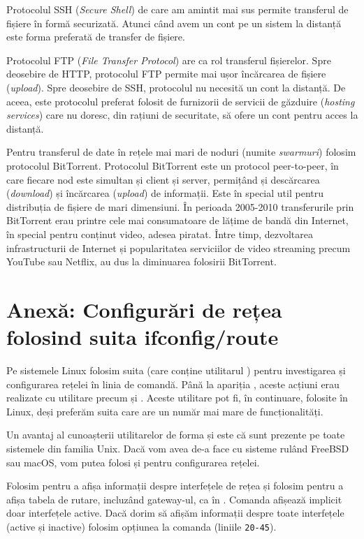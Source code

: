 Protocolul SSH (\textit{Secure Shell}) de care am amintit mai sus permite transferul de fișiere în formă securizată.
Atunci când avem un cont pe un sistem la distanță este forma preferată de transfer de fișiere.

Protocolul FTP  (\textit{File Transfer Protocol}) are ca rol transferul fișierelor.
Spre deosebire de HTTP, protocolul FTP permite mai ușor încărcarea de fișiere (\textit{upload}).
Spre deosebire de SSH, protocolul nu necesită un cont la distanță.
De aceea, este protocolul preferat folosit de furnizorii de servicii de găzduire (\textit{hosting services}) care nu doresc, din rațiuni de securitate, să ofere un cont pentru acces la distanță.

Pentru transferul de date în rețele mai mari de noduri (numite \textit{swarmuri}) folosim protocolul BitTorrent.
Protocolul BitTorrent este un protocol peer-to-peer, în care fiecare nod este simultan și client și server, permițând și descărcarea (\textit{download}) și încărcarea (\textit{upload}) de informații.
Este în special util pentru distribuția de fișiere de mari dimensiuni.
În perioada 2005-2010 transferurile prin BitTorrent erau printre cele mai consumatoare de lățime de bandă din Internet, în special pentru conținut video, adesea piratat.
Între timp, dezvoltarea infrastructurii de Internet și popularitatea serviciilor de video streaming precum YouTube sau Netflix, au dus la diminuarea folosirii BitTorrent.

\section{Anexă: Configurări de rețea folosind suita ifconfig/route}
\label{sec:net:config-ifconfig}

Pe sistemele Linux folosim suita  (care conține utilitarul ) pentru investigarea și configurarea rețelei în linia de comandă.
Până la apariția , aceste acțiuni erau realizate cu utilitare precum  și .
Aceste utilitare pot fi, în continuare, folosite în Linux, deși preferăm suita  care are un număr mai mare de funcționalități.

Un avantaj al cunoașterii utilitarelor de forma  și  este că sunt prezente pe toate sistemele din familia Unix.
Dacă vom avea de-a face cu sisteme rulând FreeBSD sau macOS, vom putea folosi  și  pentru configurarea rețelei.

Folosim  pentru a afișa informații despre interfețele de rețea și folosim  pentru a afișa tabela de rutare, incluzând gateway-ul, ca în .
Comanda  afișează implicit doar interfețele active.
Dacă dorim să afișăm informații despre toate interfețele (active și inactive) folosim opțiunea  la comanda  (liniile \texttt{20-45}).

